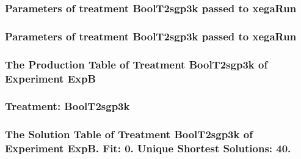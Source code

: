 \documentclass[18pt,c]{beamer}
\begin{document}

 \begin{frame}
 \fontsize{8pt}{9pt}\selectfont
 \frametitle{  Parameters of treatment BoolT2sgp3k passed to xegaRun
 }

 \label{ExpBtParmTable046.tex}  
 \end{frame}


 \begin{frame}
 \fontsize{8pt}{9pt}\selectfont
 \frametitle{  Parameters of treatment BoolT2sgp3k passed to xegaRun
 }

 \label{ExpBtParmTable047.tex}  
 \end{frame}

 \begin{frame}
 \fontsize{8pt}{9pt}\selectfont
 \frametitle{ The Production Table of Treatment BoolT2sgp3k of Experiment ExpB }

 \label{ExpBGrammarTable011.tex}  
 \end{frame}

 \begin{frame}
 \fontsize{8pt}{9pt}\selectfont
 \frametitle{ Treatment: BoolT2sgp3k }

 \label{ExpBStatsTable018.tex}  
 \end{frame}

 \begin{frame}
 \fontsize{8pt}{9pt}\selectfont
 \frametitle{ The Solution Table of Treatment BoolT2sgp3k of Experiment ExpB. Fit: 0. Unique Shortest Solutions: 40. }

 \label{ExpBSolutionTable011.tex}  
 \end{frame}
\end{document}
